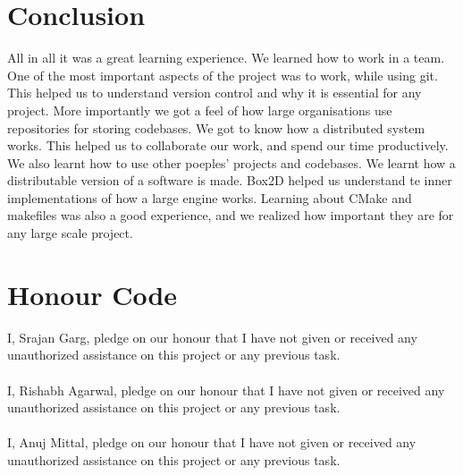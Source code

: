 \documentclass[a4paper,12pt]{article}
\begin{document}
\section{Conclusion}
All in all it was a great learning experience. We learned how to work in a team. One of the most important aspects of the project was to work, while using git. This helped us to understand version control and why it is essential for any project. More importantly we got a feel of how large organisations use repositories for storing codebases. We got to know how a distributed system works. This helped us to collaborate our work, and spend our time productively.\\

We also learnt how to use other poeples' projects and codebases. We learnt how a distributable version of a software is made. Box2D helped us understand te inner implementations of how a large engine works. Learning about CMake and makefiles was also a good experience, and we realized how important they are for any large scale project.


\section{Honour Code}

I, Srajan Garg, pledge on our honour that I have not given or received any unauthorized assistance on this project or any previous task.\\ \\
I, Rishabh Agarwal, pledge on our honour that I have not given or received any unauthorized assistance on this project or any previous task.\\ \\ 
I, Anuj Mittal, pledge on our honour that I have not given or received any unauthorized assistance on this project or any previous task.\\ \\

\begin{small}


\end{small}
\end{document}
